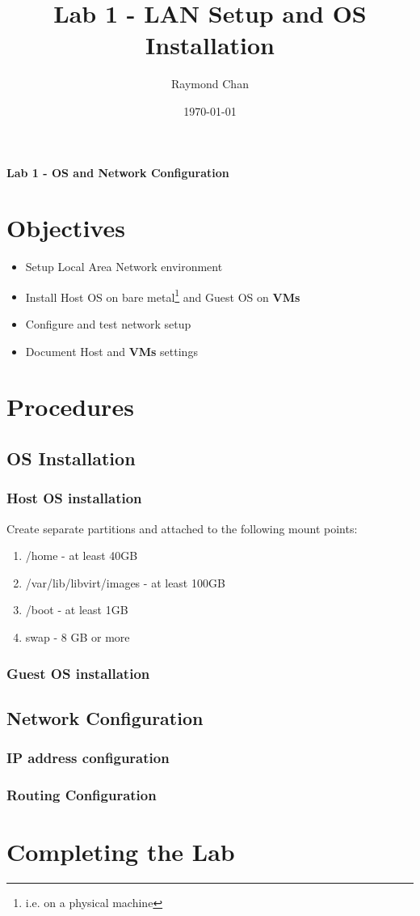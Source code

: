 \documentclass[12pt]{article}
\newcommand{\keyword}[1]{\textbf{#1}}
\begin{document}
\title{Lab 1 - LAN Setup and OS Installation}
\author{Raymond Chan}
\date{\today}
\maketitle
\tableofcontents
\newpage
{\centering
	\LARGE\bfseries Lab 1 - OS and Network Configuration \\

}
\section{Objectives}
%
\begin{itemize}
	\item Setup Local Area Network environment
	\item Install Host OS on bare metal\footnote{i.e. on a physical machine} and Guest OS on \keyword{VMs}
	\item Configure and test network setup
	\item Document Host and \keyword{VMs} settings
\end{itemize}
\section{Procedures}

\subsection{OS Installation}
\subsubsection{Host OS installation}
	Create separate partitions and attached to the following mount points:
	\begin{enumerate}
	\item /home - at least 40GB
	\item /var/lib/libvirt/images - at least 100GB
	\item /boot - at least 1GB
	\item swap - 8 GB or more
	\end{enumerate}
\subsubsection{Guest OS installation}
%
\subsection{Network \keyword{Configuration}}
\subsubsection{IP address configuration}
\subsubsection{Routing Configuration}
%
\section{Completing the Lab}
%
\end{document}
